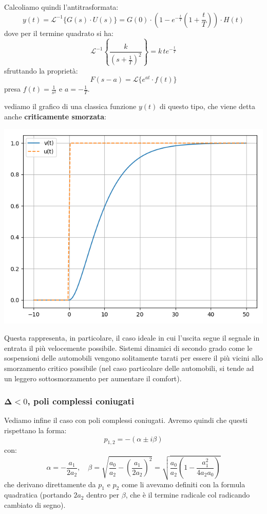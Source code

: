 \documentclass[a4paper,11pt]{article}
\begin{document}
Calcoliamo quindi l'antitrasformata:
$$
y(t) = \mathcal{L}^{-1} \{G(s) \cdot U(s)\} = G(0) \cdot \left( 1 - e^{-\frac{t}{T}} \left( 1 + \frac{t}{T} \right) \right) \cdot H(t)
$$
dove per il termine quadrato si ha:
$$
\mathcal{L}^{-1} \left\{ \frac{ k }{ \left( s + \frac{1}{T} \right)^2 } \right\} = k \, t e^{-\frac{t}{T}}
$$
sfruttando la proprietà:
$$
F(s - a) = \mathcal{L} \{ e^{at} \cdot f(t) \}
$$
presa $f(t) = \frac{1}{s^2}$ e $a = -\frac{1}{T}$.

\noindent
\begin{minipage}{\textwidth}
vediamo il grafico di una classica funzione $y(t)$ di questo tipo, che viene detta anche \textbf{criticamente smorzata}:
\begin{center}
	\includegraphics[scale=0.66]{../figures/second_degree_critical.png}
\end{center}
\end{minipage}

Questa rappresenta, in particolare, il caso ideale in cui l'uscita segue il segnale in entrata il più velocemente possibile.
Sistemi dinamici di secondo grado come le sospensioni delle automobili vengono solitamente tarati per essere il più vicini allo smorzamento critico possibile (nel caso particolare delle automobili, si tende ad un leggero sottosmorzamento per aumentare il comfort).

\subsubsection{$\mathbf \Delta < 0$, poli complessi coniugati}
Vediamo infine il caso con poli complessi coniugati.
Avremo quindi che questi rispettano la forma:
$$
p_{1,2} =  - \left( \alpha \pm i \beta \right)
$$
con:
$$
\alpha = -\frac{a_1}{2a_2}, \quad \beta = \sqrt{ \frac{a_0}{a_2} - \left( \frac{a_1}{2 a_2} \right)^2 } = \sqrt{ \frac{a_0}{a_2} \left( 1 - \frac{a_1^2}{4 a_2 a_0} \right) }
$$
che derivano direttamente da $p_1$ e $p_2$ come li avevamo definiti con la formula quadratica (portando $2 a_2$ dentro per $\beta$, che è il termine radicale col radicando cambiato di segno).
\end{document}
